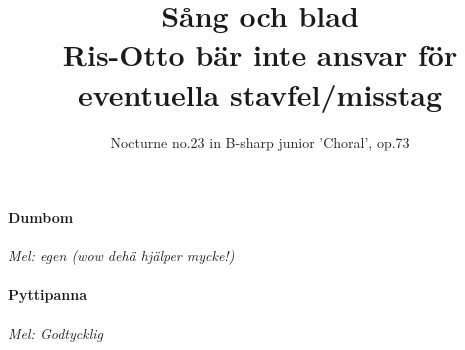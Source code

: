 \documentclass[12pt]{article}
\title{%
  Sång och blad \\%
  \large Ris-Otto bär inte ansvar för eventuella stavfel/misstag}
\author{Nocturne no.23 in B-sharp junior 'Choral', op.73}
\date{}
\begin{document}
\maketitle
\thispagestyle{empty}
\renewcommand\thepage{%
\ifcase\value{page}%
43\or
87\or
16\or
7\or
42\or
33\or
103\or
71\or
17\else

\arabic{page}%
\fi}


\newpage
\noindent
\begin{minipage}{.475\textwidth}
	\noindent
	\paragraph*{Dumbom\\}
	\vspace{3px}
	\textit{Mel: egen (wow dehä hjälper mycke!)}\\
\end{minipage}%
\hspace{0.075\textwidth}
\noindent
\begin{minipage}{.45\textwidth}
	\noindent
	\paragraph*{Pyttipanna\\} 
	\vspace{3px}
	\textit{Mel: Godtycklig}\\
\end{minipage}
\end{document}
